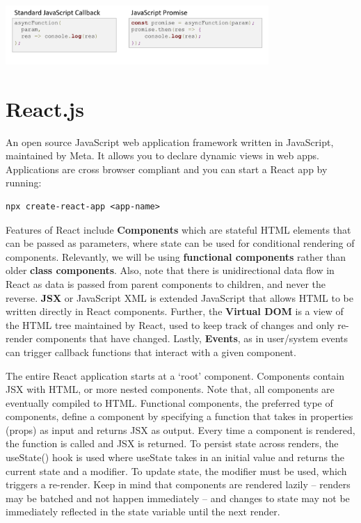 \documentclass{article}
\begin{document}
\includegraphics[width=10cm]{async.png}

\section*{React.js}
An open source JavaScript web application framework written in JavaScript, maintained by Meta. It allows you to declare dynamic views in web apps. Applications are cross browser compliant and you can start a React app by running: 
\begin{tcolorbox}
\begin{verbatim}
npx create-react-app <app-name>
\end{verbatim}
\end{tcolorbox}

Features of React include \textbf{Components} which are stateful HTML elements that can be passed as parameters, where state can be used for conditional rendering of components. Relevantly, we will be using \textbf{functional components} rather than older \textbf{class components}. Also, note that there is unidirectional data flow in React as data is passed from parent components to children, and never the reverse. \textbf{JSX} or JavaScript XML is extended JavaScript that allows HTML to be written directly in React components. Further, the \textbf{Virtual DOM} is a view of the HTML tree maintained by React, used to keep track of changes and only re-render components that have changed. Lastly, \textbf{Events}, as in user/system events can trigger callback functions that interact with a given component.

The entire React application starts at a `root' component. Components contain JSX with HTML, or more nested components. Note that, all components are eventually compiled to HTML. Functional components, the preferred type of components, define a component by specifying a function that takes in properties (props) as input and returns JSX as output. Every time a component is rendered, the function is called and JSX is returned. To persist state across renders, the useState() hook is used where useState takes in an initial value and returns the current state and a modifier. To update state, the modifier must be used, which triggers a re-render. Keep in mind that components are rendered lazily -- renders may be batched and not happen immediately -- and changes to state may not be immediately reflected in the state variable until the next render. 
\end{document}
